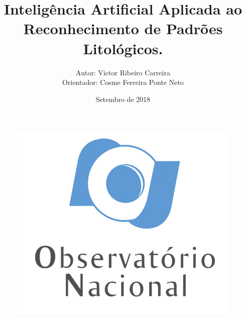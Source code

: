 \documentclass[aspectratio=10]{beamer} %
\author[Carreira,V.R.]{Autor: Victor Ribeiro Carreira \\ Orientador: Cosme Ferreira Ponte Neto}
\title{Inteligência Artificial Aplicada  ao  Reconhecimento de Padrões Litológicos.}
\institute{Pós-Graduação em Geofísica}
\date{Setembro de 2018}
\begin{document}
{%
	\begin{frame}
	\begin{figure}
		\centering
		\includegraphics[scale=0.4]{Imagens/logonvertical.jpg} 
	\end{figure}
\end{frame}
}
\bgroup
\makeatletter
{}
\makeatother
\maketitle
\egroup 
{}
\setcounter{framenumber}{0}
\AtBeginSection[]
%
%
\end{document}
